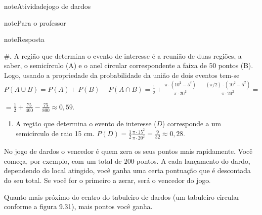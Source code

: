 \begin{sphinxadmonition}{note}{Atividade}{jogo de dardos}
\begin{sphinxadmonition}{note}{Para o professor}
\begin{sphinxadmonition}{note}{Resposta}
\begin{enumerate}
\end{enumerate}

\#. A região que determina o evento de interesse é a reunião de duas regiões, a saber, o semicírculo (A) e o anel circular correspondente a faixa de 50 pontos (B). Logo, usando a propriedade da probabilidade da união de dois eventos tem-se
\(P(A\cup B)=P(A)+P(B)-P(A\cap B)= \frac{1}{2}+\frac{\pi\cdot (10^2-5^2)}{\pi\cdot 20^2}-\frac{(\pi/2)\cdot (10^2-5^2)}{\pi\cdot 20^2}=\)

\(=\frac{1}{2}+\frac{75}{400}-\frac{75}{800}\approx 0,59.\)
\begin{enumerate}
\item {} 
A região que determina o evento de interesse (\(D\))   corresponde a um semicírculo de raio 15 cm. \(P(D)=\frac{1}{2}\frac{\pi\cdot 15^2}{\pi \cdot 20^2}=\frac{9}{32}\approx 0,28.\)

\end{enumerate}
\end{sphinxadmonition}
\end{sphinxadmonition}
\end{sphinxadmonition}

No jogo de dardos o vencedor é quem zera os seus pontos mais rapidamente. Você começa, por exemplo, com um total de 200 pontos. A cada lançamento do dardo, dependendo do local atingido, você ganha uma certa pontuação que é descontada do seu total. Se você for o primeiro a zerar, será o vencedor do jogo.

Quanto mais próximo do centro do tabuleiro de dardos (um tabuleiro circular conforme a figura 9.31), mais pontos você ganha.

